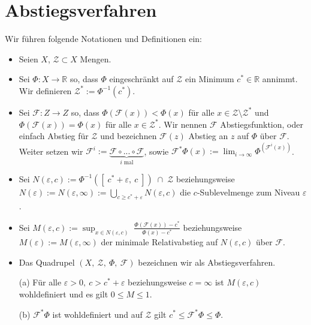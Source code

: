 
\section{Abstiegsverfahren}
Wir führen folgende Notationen und Definitionen ein:
\begin{itemize}
\item Seien $X$, $\mathcal{Z} \subset X$ Mengen.
\item Sei $\Phi : X \rightarrow \mathbb{R}$ so, dass $\Phi$ eingeschränkt auf $\mathcal{Z}$ ein Minimum $c^* \in \mathbb{R}$ annimmt. Wir definieren $\mathcal{Z^*} := \Phi^{-1}(c^*)$. 

\item Sei $\mathcal{F} : Z \rightarrow Z$ so, dass $\Phi(\mathcal{F}(x)) < \Phi(x)$ für alle $x \in \mathcal{Z} \setminus \mathcal{Z^*}$ und $\Phi(\mathcal{F}(x)) = \Phi(x)$ für alle $x \in \mathcal{Z}^*$. Wir nennen $\mathcal{F}$ Abstiegsfunktion, oder einfach Abstieg für $\mathcal{Z}$ und bezeichnen $\mathcal{F}(z)$ Abstieg an $z$ auf $\Phi$ über $\mathcal{F}$. Weiter setzen wir $\mathcal{F}^i := 
\underbrace{\mathcal{F} \circ ... \circ \mathcal{F}}_{i \; \text{mal}}$, sowie $\mathcal{F}^* \Phi(x) := \lim_{i \rightarrow \infty}\Phi^(\mathcal{F}^i(x))$.

\item Sei $N(\varepsilon, c) := \Phi^{-1}([ \; c^* + \varepsilon,\ c \; ]) \; \cap \; \mathcal{Z}$ beziehungsweise
$
N(\varepsilon) := N(\varepsilon, \infty) := 
\bigcup\limits_{c \geq c^*+\varepsilon} N(\varepsilon,c) $  
die $c$-Sublevelmenge zum Niveau $\varepsilon$.

\item Sei 
$
M(\varepsilon,c) := 
\sup_{x \in N(\varepsilon,c)} \; \frac{\Phi(\mathcal{F}(x)) - c^*}{\Phi(x)-c^*}
$
beziehungsweise $M(\varepsilon) := M(\varepsilon, \infty)$
der minimale Relativabstieg auf $N(\varepsilon,c)$ über $\mathcal{F}$.

\item Das Quadrupel $(X ,\ \mathcal{Z} ,\ \Phi ,\ \mathcal{F})$ bezeichnen wir als Abstiegsverfahren.


\end{itemize}

\begin{bemerkung}
\begin{itemize}
\item[(a)] Für alle $\varepsilon > 0, \ c > c^* + \varepsilon$ beziehungsweise $c = \infty$ ist $M(\varepsilon, c)$ wohldefiniert und es gilt $0 \leq M \leq 1$.
\item[(b)] $\mathcal{F}^* \Phi$ ist wohldefiniert und auf $\mathcal{Z}$ gilt $c^* \leq \mathcal{F}^* \Phi \leq \Phi$.
\end{itemize}	
\end{bemerkung}

